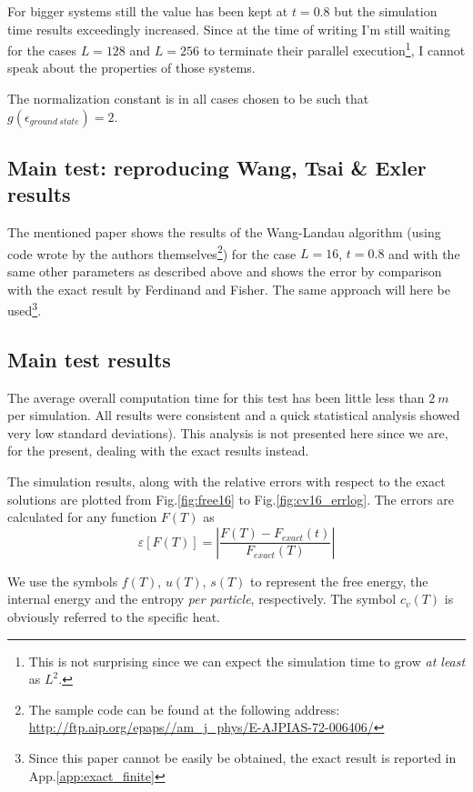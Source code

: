 \documentclass[11pt]{article}
\newcommand{\figname}{Fig.}
\newcommand{\appname}{App.}
\begin{document}
For bigger systems still the value has been kept at $t=0.8$ but the simulation time results exceedingly increased. Since at the time of writing I'm still waiting for the cases $L=128$ and $L=256$ to terminate their parallel execution\footnote{This is not surprising since we can expect the simulation time to grow {\em at least} as $L^2$.}, I cannot speak about the properties of those systems.

The normalization constant is in all cases chosen to be such that $g(\epsilon_{ground~state}) = 2$.

\subsection{Main test: reproducing Wang, Tsai \& Exler results}

The mentioned paper shows the results of the Wang-Landau algorithm (using code wrote by the authors themselves\footnote{The sample code can be found at the following address: \url{http://ftp.aip.org/epaps//am_j_phys/E-AJPIAS-72-006406/}}) for the case $L=16$, $t=0.8$ and with the same other parameters as described above and shows the error by comparison with the exact result by Ferdinand and Fisher\cite{bib:exact}. The same approach will here be used\footnote{Since this paper cannot be easily be obtained, the exact result is reported in \appname \ref{app:exact_finite}}.



\subsection{Main test results}

The average overall computation time for this test has been little less than $2~m$ per simulation. All results were consistent and a quick statistical analysis showed very low standard deviations). This analysis is not presented here since we are, for the present, dealing with the exact results instead.

The simulation results, along with the relative errors with respect to the exact solutions are plotted from \figname \ref{fig:free16} to \figname \ref{fig:cv16_errlog}. The errors are calculated for any function $F(T)$ as
\[
	\varepsilon[F(T)] = \left\lvert\frac{F(T) - F_{exact}(t)}{F_{exact}(T)}\right\rvert
\]

We use the symbols $f(T)$, $u(T)$, $s(T)$ to represent the free energy, the internal energy and the entropy {\em per particle}, respectively. The symbol $c_v(T)$ is obviously referred to the specific heat.
\end{document}
